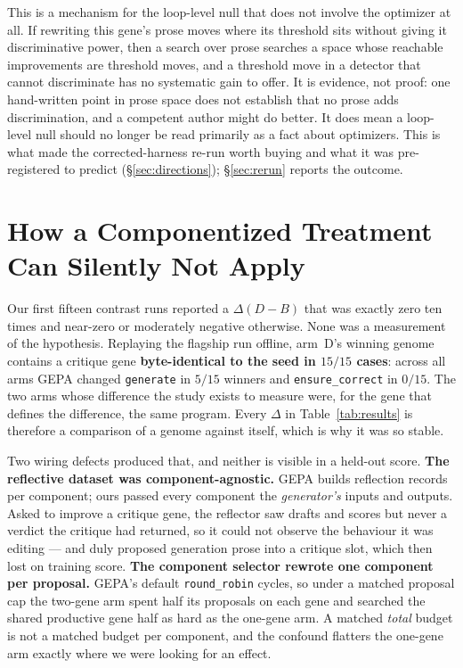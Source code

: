 \documentclass[11pt]{article}
\newcommand{\dd}{\ensuremath{\Delta}}
\begin{document}
This is a mechanism for the loop-level null that does not involve the optimizer at all. If
rewriting this gene's prose moves where its threshold sits without giving it discriminative
power, then a search over prose searches a space whose reachable improvements are threshold
moves, and a threshold move in a detector that cannot discriminate has no systematic gain to
offer. It is evidence, not proof: one hand-written point in prose space does not establish
that no prose adds discrimination, and a competent author might do better. It does mean a
loop-level null should no longer be read primarily as a fact about optimizers. This is what
made the corrected-harness re-run worth buying and what it was pre-registered to predict
(\S\ref{sec:directions}); \S\ref{sec:rerun} reports the outcome.


\section{How a Componentized Treatment Can Silently Not Apply}
\label{sec:defect}

Our first fifteen contrast runs reported a $\dd(D-B)$ that was exactly zero ten times and
near-zero or moderately negative otherwise. None was a measurement of the hypothesis. Replaying the flagship run offline, arm~D's winning genome contains a critique
gene \textbf{byte-identical to the seed in $15/15$ cases}: across all arms GEPA changed
\texttt{generate} in $5/15$ winners and \texttt{ensure\_correct} in $0/15$. The two arms whose
difference the study exists to measure were, for the gene that defines the difference, the
same program. Every $\dd$ in Table~\ref{tab:results} is therefore a comparison of a genome
against itself, which is why it was so stable.

Two wiring defects produced that, and neither is visible in a held-out score.
\textbf{The reflective dataset was component-agnostic.} GEPA builds reflection records per
component; ours passed every component the \emph{generator's} inputs and outputs. Asked to
improve a critique gene, the reflector saw drafts and scores but never a verdict the critique
had returned, so it could not observe the behaviour it was editing --- and duly proposed
generation prose into a critique slot, which then lost on training score. \textbf{The
component selector rewrote one component per proposal.} GEPA's default \texttt{round\_robin}
cycles, so under a matched proposal cap the two-gene arm spent half its proposals on each gene
and searched the shared productive gene half as hard as the one-gene arm. A matched
\emph{total} budget is not a matched budget per component, and the confound flatters the
one-gene arm exactly where we were looking for an effect.
\end{document}
